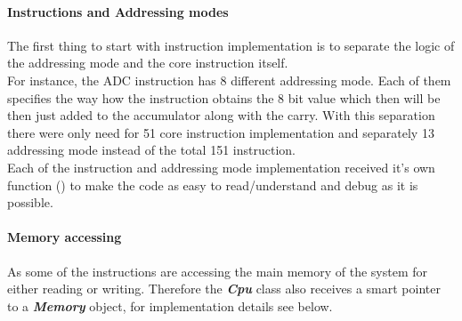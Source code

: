 \documentclass[]{report}
\begin{document}
\paragraph{Instructions and Addressing modes}
The first thing to start with instruction implementation is to separate the logic of the addressing mode and the core instruction itself.
\\
 For instance, the ADC instruction has 8 different addressing mode. Each of them specifies the way how the instruction obtains the 8 bit value which then will be then just added to the accumulator along with the carry. 
 With this separation there were only need for 51 core instruction implementation and separately 13 addressing mode instead of the total 151 instruction. 
\\
Each of the instruction and addressing mode implementation received it's own function (\cite{DCPU}) to make the code as easy to read/understand and debug as it is possible.

\paragraph{Memory accessing}
As some of the instructions are accessing the main memory of the system for either reading or writing. Therefore  the  \textbf{\textit{Cpu}} class also receives a smart pointer to a \textbf{\textit{Memory}} object, for implementation details see below.
\end{document}

